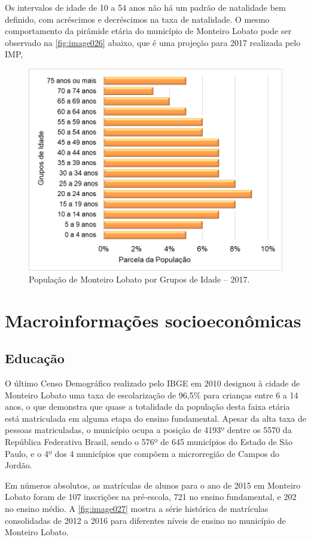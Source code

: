 Os intervalos de idade de 10 a 54 anos não há um padrão de natalidade bem definido, com acréscimos e decréscimos na taxa de natalidade. O mesmo comportamento da pirâmide etária do município de Monteiro Lobato pode ser observado na \autoref{fig:image026} abaixo, que é uma projeção para 2017 realizada pelo IMP,

  \newpage
  \clearpage
  \begin{figure}[h!]
 	\centering
 	\includegraphics[width=0.8\linewidth]{produtos/proddois/image026}
 	\caption{População de Monteiro Lobato por Grupos de Idade – 2017.}
 	\label{fig:image026}
 \end{figure}

\section{Macroinformações socioeconômicas}
\subsection{Educação}

O último Censo Demográfico realizado pelo IBGE em 2010 designou à cidade de Monteiro Lobato uma taxa de escolarização de 96,5\% para crianças entre 6 a 14 anos, o que demonstra que quase a totalidade da população desta faixa etária está matriculada em alguma etapa do ensino fundamental. Apesar da alta taxa de pessoas matriculadas, o município ocupa a posição de 4193º dentre os 5570 da República Federativa Brasil, sendo o 576º de 645 municípios do Estado de São Paulo, e o 4º dos 4 municípios que compõem a microrregião de Campos do Jordão.

Em números absolutos, as matrículas de alunos para o ano de 2015 em Monteiro Lobato foram de 107 inscrições na pré-escola, 721 no ensino fundamental, e 202 no ensino médio. A \autoref{fig:image027} mostra a série histórica de matrículas consolidadas de 2012 a 2016 para diferentes níveis de ensino no município de Monteiro Lobato.

